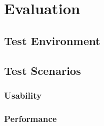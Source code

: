 \chapter{Evaluation\label{cha:chapter6}}


\section{Test Environment\label{sec:eval_te_en}}

\section{Test Scenarios\label{sec:eval__te_sc}}
	\subsection{Usability\label{seq:eval_usab}}
	
	\subsection{Performance\label{seq:eval_perf}}